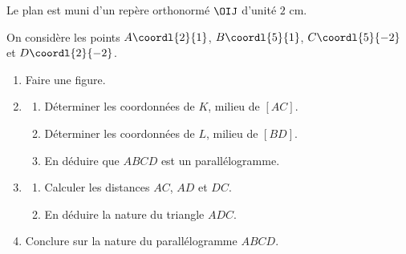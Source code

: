 \begin{exo}
	Le plan est muni d'un repère orthonormé $\OIJ$ d'unité $2\text{ cm}$.

	On considère les points $A\coordl{2}{1}$, $B\coordl{5}{1}$, $C\coordl{5}{-2}$ et $D\coordl{2}{-2}$.
	\begin{enumerate}
		\item Faire une figure.
		\item
		      \begin{enumerate}
			      \item Déterminer les coordonnées de $K$, milieu de $[AC]$.
			      \item Déterminer les coordonnées de $L$, milieu de $[BD]$.
			      \item En déduire que $ABCD$ est un parallélogramme.
		      \end{enumerate}
		\item
		      \begin{enumerate}
			      \item Calculer les distances $AC$, $AD$ et $DC$.
			      \item En déduire la nature du triangle $ADC$.
		      \end{enumerate}
		\item Conclure sur la nature du parallélogramme $ABCD$.
	\end{enumerate}
\end{exo}


